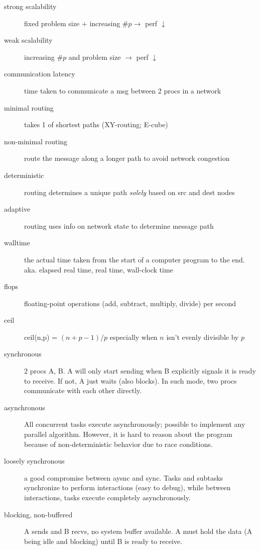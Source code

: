 \begin{description}
\item[strong scalability] fixed problem size + increasing $\# p \rightarrow$ perf $\downarrow$

\item[weak scalability] increasing $\# p$ and problem size $\rightarrow$ perf $\downarrow$

\item[communication latency] time taken to communicate a msg between 2 procs in a network

\item[minimal routing] takes 1 of shortest paths (XY-routing; E-cube)

\item[non-minimal routing] route the message along a longer path to avoid network congestion

\item[deterministic] routing determines a unique path \emph{solely} based on src and dest nodes

\item[adaptive] routing uses info on network state to determine message path

\item[walltime] the actual time taken from the start of a computer program to the end. aka. elapsed real time, real time, wall-clock time
\item[flops] floating-point operations (add, subtract, multiply, divide) per second
\item[ceil] ceil(n,p) = $(n + p - 1) / p$ especially when $n$ isn't evenly divisible by $p$

\item[synchronous] 2 procs A, B. A will only start sending when B explicitly signals it is ready to receive.  If not, A just waits (also blocks).  In such mode, two procs communicate with each other directly.

\item[asynchronous] All concurrent tasks execute asynchronously; possible to implement any parallel algorithm.  However, it is hard to reason about the program because of non-deterministic behavior due to race conditions.

\item[loosely synchronous] a good compromise between aysnc and sync.  Tasks and subtasks synchronize to perform interactions (easy to debug), while between interactions, tasks execute completely asynchronously.

\item[blocking, non-buffered] A sends and B recvs, no system buffer available.  A must hold the data (A being idle and blocking) until B is ready to receive.


\end{description}

